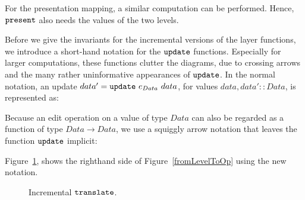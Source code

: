 For the presentation mapping, a similar computation can be performed. Hence, ${\tt present}$ also needs the values of the two levels. 

Before we give the invariants for the incremental versions of the layer functions, we introduce a short-hand notation for the ${\tt update}$ functions. Especially for larger computations, these functions clutter the diagrams, due to crossing arrows and the many rather uninformative appearances of ${\tt update}$. In the normal notation, an update $data' = {\tt update}~e_{Data}~data$, for values 
$data, data' :: Data$, is represented as:\\

\begin{small}
\end{small}

\smallskip
Because an edit operation on a value of type $Data$ can also be regarded as a function of type 
$Data \rightarrow Data$, we use a squiggly arrow notation that leaves the function ${\tt update}$ implicit:\\

\begin{small}
\end{small}

Figure~\ref{incrementalTranslate}, shows the righthand side of Figure~\ref{fromLevelToOp} using the new notation.

\begin{figure}
\begin{small}
\begin{center}
\begin{center}
\begin{small}
\bigskip \noindent
{}
\end{small}
\end{center}\caption{Incremental ${\tt translate}$.}\label{incrementalTranslate} 
\end{center}
\end{small}
\end{figure}

